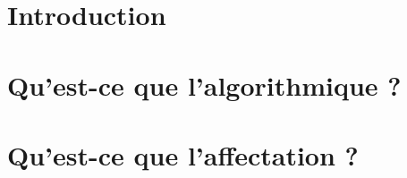 \documentclass[11pt,a4paper,colorlinks,breaklinks]{article}
\renewcommand{\headrulewidth}{0pt}
\renewcommand{\footrulewidth}{0pt}
\begin{document}
\pagestyle{fancy}
\fancyhead{}
\fancyhead[R]{\thepage/\pageref{LastPage}}
\fancyfoot{}
\fancyfoot[L]{}
\fancyfoot[C]{}
\fancyfoot[R]{}
\setlength{\headheight}{47pt}
\setlength{\footskip}{38pt}
\renewcommand{\headrulewidth}{0pt}
\renewcommand{\footrulewidth}{0pt}

\setcounter{tocdepth}{2}
\tableofcontents

\newpage
\section{Introduction}\label{sec:introduction}
	

\newpage
\section{Qu'est-ce que l'algorithmique ?}\label{sec:algo}
	
	
\newpage
\section{Qu'est-ce que l'affectation ?}\label{sec:affectation}
	
	
\newpage
\end{document}
